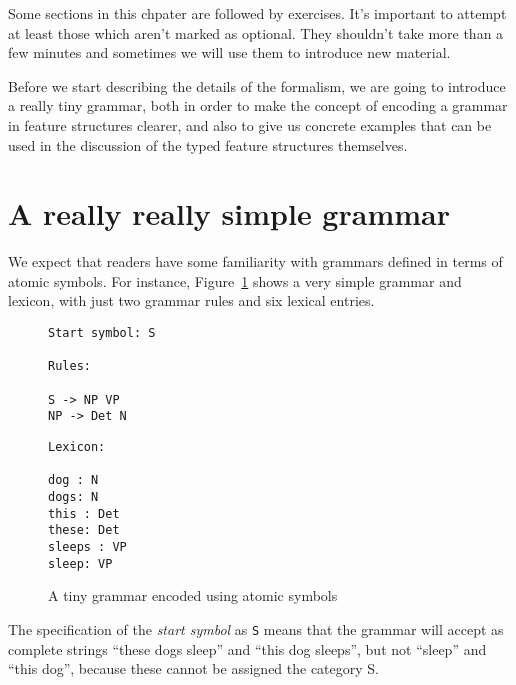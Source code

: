 \documentclass[12pt]{report}
\newcommand{\newterm}[1]{{\it #1}}
\begin{document}
Some sections in this chpater are followed by
exercises.  It's important to attempt at least
those which aren't marked as 
optional.  They shouldn't take more than a few minutes 
and sometimes we will use them to introduce new material.

Before we start describing the details of the formalism,
we are going to introduce a really tiny grammar, both in order
to make the concept of encoding a grammar in feature structures clearer,
and also to give us concrete examples that can be used in the discussion
of the typed feature structures themselves.  


\section{A really really simple grammar}

We expect that readers have some familiarity with
grammars defined in terms of atomic symbols.  For instance,
Figure~\ref{smplatomic} shows a very simple grammar and lexicon,
with just two grammar rules and six lexical entries.
\begin{figure}
{\small
\begin{minipage}[t]{3in}
\begin{verbatim}
Start symbol: S

Rules:

S -> NP VP
NP -> Det N
\end{verbatim}
\end{minipage}
\begin{minipage}[t]{3in}
\begin{verbatim}
Lexicon:

dog : N
dogs: N
this : Det
these: Det
sleeps : VP
sleep: VP

\end{verbatim}
\end{minipage}}
\caption{A tiny grammar encoded using atomic symbols}
\label{smplatomic}
\end{figure}
The specification of the \newterm{start symbol} 
as {\tt S} means that the grammar will
accept as complete strings ``these dogs sleep'' and ``this dog sleeps'',
but not ``sleep'' and ``this dog'', because these cannot be assigned
the category S.
\end{document}
